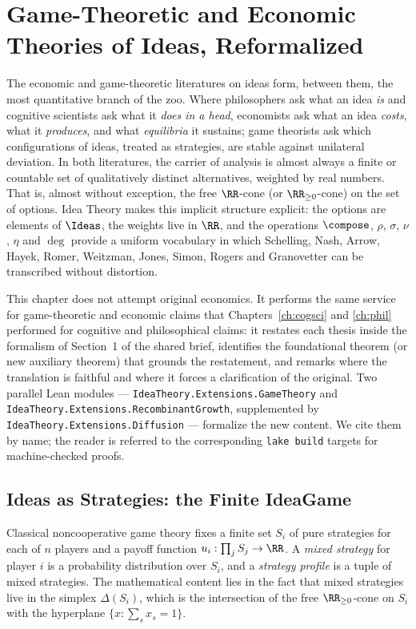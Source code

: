 \chapter{Game-Theoretic and Economic Theories of Ideas, Reformalized}\label{ch:econ}

The economic and game-theoretic literatures on ideas form, between them, the
most quantitative branch of the zoo. Where philosophers ask what an idea
\emph{is} and cognitive scientists ask what it \emph{does in a head},
economists ask what an idea \emph{costs}, what it \emph{produces}, and what
\emph{equilibria} it sustains; game theorists ask which configurations of
ideas, treated as strategies, are stable against unilateral deviation. In
both literatures, the carrier of analysis is almost always a finite or
countable set of qualitatively distinct alternatives, weighted by real
numbers. That is, almost without exception, the free $\RR$-cone (or
$\RR_{\geq 0}$-cone) on the set of options. Idea Theory makes this implicit
structure explicit: the options are elements of $\Ideas$, the weights live
in $\RR$, and the operations $\compose$, $\rho$, $\sigma$, $\nu$, $\eta$ and
$\deg$ provide a uniform vocabulary in which Schelling, Nash, Arrow, Hayek,
Romer, Weitzman, Jones, Simon, Rogers and Granovetter can be transcribed
without distortion.

This chapter does not attempt original economics. It performs the same
service for game-theoretic and economic claims that
Chapters~\ref{ch:cogsci} and \ref{ch:phil} performed for cognitive and
philosophical claims: it restates each thesis inside the formalism of
Section~1 of the shared brief, identifies the foundational theorem (or new
auxiliary theorem) that grounds the restatement, and remarks where the
translation is faithful and where it forces a clarification of the original.
Two parallel Lean modules — \texttt{IdeaTheory.Extensions.GameTheory} and
\texttt{IdeaTheory.Extensions.RecombinantGrowth}, supplemented by
\texttt{IdeaTheory.Extensions.Diffusion} — formalize the new content. We
cite them by name; the reader is referred to the corresponding
\texttt{lake build} targets for machine-checked proofs.

\section{Ideas as Strategies: the Finite IdeaGame}
\label{sec:idea-strategies}

Classical noncooperative game theory \citep{Nash1950} fixes a finite set
$S_i$ of pure strategies for each of $n$ players and a payoff function
$u_i:\prod_j S_j \to \RR$. A \emph{mixed strategy} for player $i$ is a
probability distribution over $S_i$, and a \emph{strategy profile} is a
tuple of mixed strategies. The mathematical content lies in the fact that
mixed strategies live in the simplex $\Delta(S_i)$, which is the
intersection of the free $\RR_{\geq 0}$-cone on $S_i$ with the hyperplane
$\{x : \sum_s x_s = 1\}$.

